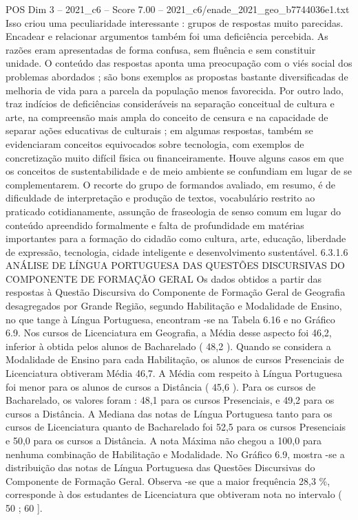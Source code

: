 \begin{textsample}{POS Dim 3 – 2021\_c6 – Score 7.00 – 2021\_c6/enade\_2021\_geo\_b7744036e1.txt}
Isso criou uma peculiaridade interessante : grupos de respostas muito parecidas.
Encadear e relacionar argumentos também foi uma deficiência percebida.
As razões eram apresentadas de forma confusa, sem fluência e sem constituir unidade.
O conteúdo das respostas aponta uma preocupação com o viés social dos problemas abordados ; são bons exemplos as propostas bastante diversificadas de melhoria de vida para a parcela da população menos favorecida.
Por outro lado, traz indícios de deficiências consideráveis na separação conceitual de cultura e arte, na compreensão mais ampla do conceito de censura e na capacidade de separar ações educativas de culturais ; em algumas respostas, também se evidenciaram conceitos equivocados sobre tecnologia, com exemplos de concretização muito difícil física ou financeiramente.
Houve alguns casos em que os conceitos de sustentabilidade e de meio ambiente se confundiam em lugar de se complementarem.
O recorte do grupo de formandos avaliado, em resumo, é de dificuldade de interpretação e produção de textos, vocabulário restrito ao praticado cotidianamente, assunção de fraseologia de senso comum em lugar do conteúdo apreendido formalmente e falta de profundidade em matérias importantes para a formação do cidadão como cultura, arte, educação, liberdade de expressão, tecnologia, cidade inteligente e desenvolvimento sustentável. 6.3.1.6 ANÁLISE DE LÍNGUA PORTUGUESA DAS QUESTÕES DISCURSIVAS DO COMPONENTE DE FORMAÇÃO GERAL Os dados obtidos a partir das respostas à Questão Discursiva do Componente de Formação Geral de Geografia desagregados por Grande Região, segundo Habilitação e Modalidade de Ensino, no que tange à Língua Portuguesa, encontram -se na Tabela 6.16 e no Gráfico 6.9.
Nos cursos de Licenciatura em Geografia, a Média desse aspecto foi 46,2, inferior à obtida pelos alunos de Bacharelado ( 48,2 ).
Quando se considera a Modalidade de Ensino para cada Habilitação, os alunos de cursos Presenciais de Licenciatura obtiveram Média 46,7.
A Média com respeito à Língua Portuguesa foi menor para os alunos de cursos a Distância ( 45,6 ).
Para os cursos de Bacharelado, os valores foram : 48,1 para os cursos Presenciais, e 49,2 para os cursos a Distância.
A Mediana das notas de Língua Portuguesa tanto para os cursos de Licenciatura quanto de Bacharelado foi 52,5 para os cursos Presenciais e 50,0 para os cursos a Distância.
A nota Máxima não chegou a 100,0 para nenhuma combinação de Habilitação e Modalidade.
No Gráfico 6.9, mostra -se a distribuição das notas de Língua Portuguesa das Questões Discursivas do Componente de Formação Geral.
Observa -se que a maior frequência 28,3 \%, corresponde à dos estudantes de Licenciatura que obtiveram nota no intervalo ( 50 ; 60 ].

\end{textsample}

